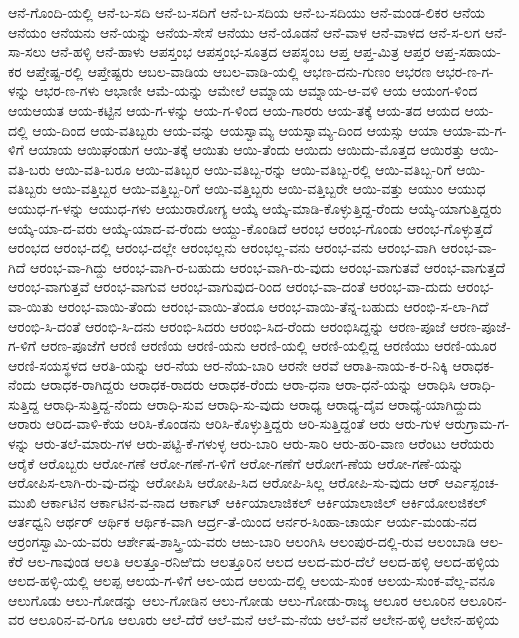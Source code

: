 ಆನೆ-ಗೊಂದಿ-ಯಲ್ಲಿ
ಆನೆ-ಬ-ಸದಿ
ಆನೆ-ಬ-ಸದಿಗೆ
ಆನೆ-ಬ-ಸದಿಯ
ಆನೆ-ಬ-ಸದಿಯು
ಆನೆ-ಮಂಡ-ಲಿಕರ
ಆನೆಯ
ಆನೆಯಂ
ಆನೆಯನು
ಆನೆ-ಯನ್ನು
ಆನೆಯ-ಸೇಸೆ
ಆನೆಯು
ಆನೆ-ಯೊಡನೆ
ಆನೆ-ವಾಳ
ಆನೆ-ವಾಳದ
ಆನೆ-ಸ-ಲಗ
ಆನೆ-ಸಾ-ಸಲು
ಆನೆ-ಹಳ್ಳಿ
ಆನೆ-ಹಾಳು
ಆಪಸ್ತಂಭ
ಆಪಸ್ತಂಭ-ಸೂತ್ರದ
ಆಪಸ್ಥಂಬ
ಆಪ್ತ
ಆಪ್ತ-ಮಿತ್ರ
ಆಪ್ತರ
ಆಪ್ತ-ಸಹಾಯ-ಕರ
ಆಪ್ತೇಷ್ಟ-ರಲ್ಲಿ
ಆಪ್ತೇಷ್ಟರು
ಆಬಲ-ವಾಡಿಯ
ಆಬಲ-ವಾಡಿ-ಯಲ್ಲಿ
ಆಭಣ-ದನು-ಗುಣಂ
ಆಭರಣ
ಆಭರ-ಣ-ಗ-ಳನ್ನು
ಆಭರ-ಣ-ಗಳು
ಆಭಾಣೀ
ಆಮೆ-ಯನ್ನು
ಆಮೇಲೆ
ಆಮ್ನಾಯ
ಆಮ್ನಾಯ-ಆ-ವಳಿ
ಆಯ
ಆಯಂಗ-ಳಿಂದ
ಆಯಆಯತ
ಆಯ-ಕಟ್ಟಿನ
ಆಯ-ಗ-ಳನ್ನು
ಆಯ-ಗ-ಳಿಂದ
ಆಯ-ಗಾರರು
ಆಯ-ತಕ್ಕೆ
ಆಯ-ತದ
ಆಯದ
ಆಯ-ದಲ್ಲಿ
ಆಯ-ದಿಂದ
ಆಯ-ವತಿಬ್ಬರು
ಆಯ-ವನ್ನು
ಆಯಸ್ವಾಮ್ಯ
ಆಯಸ್ವಾಮ್ಯ-ದಿಂದ
ಆಯಸ್ಸು
ಆಯಾ
ಆಯಾ-ಮ-ಗ-ಳಿಗೆ
ಆಯಾಯ
ಆಯಿಘಂಡುಗ
ಆಯಿ-ತಕ್ಕೆ
ಆಯಿತು
ಆಯಿ-ತೆಂದು
ಆಯಿದು
ಆಯಿದು-ಮೊತ್ತದ
ಆಯಿರತ್ತು
ಆಯಿ-ವತಿ-ಬರು
ಆಯಿ-ವತಿ-ಬರೂ
ಆಯಿ-ವತಿಬ್ಬರ
ಆಯಿ-ವತಿಬ್ಬ-ರನ್ನು
ಆಯಿ-ವತಿಬ್ಬ-ರಲ್ಲಿ
ಆಯಿ-ವತಿಬ್ಬ-ರಿಗೆ
ಆಯಿ-ವತಿಬ್ಬರು
ಆಯಿ-ವತ್ತಿಬ್ಬರ
ಆಯಿ-ವತ್ತಿಬ್ಬ-ರಿಗೆ
ಆಯಿ-ವತ್ತಿಬ್ಬರು
ಆಯಿ-ವತ್ತಿಬ್ಬರೇ
ಆಯಿ-ವತ್ತು
ಆಯುಂ
ಆಯುಧ
ಆಯುಧ-ಗ-ಳನ್ನು
ಆಯುಧ-ಗಳು
ಆಯುರಾರೋಗ್ಯ
ಆಯ್ಕೆ
ಆಯ್ಕೆ-ಮಾಡಿ-ಕೊಳ್ಳುತ್ತಿದ್ದ-ರೆಂದು
ಆಯ್ಕೆ-ಯಾಗುತ್ತಿದ್ದರು
ಆಯ್ಕೆ-ಯಾ-ದ-ವರು
ಆಯ್ಕೆ-ಯಾದ-ವ-ರೆಂದು
ಆಯ್ದು-ಕೊಂಡಿದೆ
ಆರಂಭ
ಆರಂಭ-ಗೊಂಡು
ಆರಂಭ-ಗೊಳ್ಳುತ್ತದೆ
ಆರಂಭದ
ಆರಂಭ-ದಲ್ಲಿ
ಆರಂಭ-ದಲ್ಲೇ
ಆರಂಭಲ್ಲನು
ಆರಂಭಲ್ಲ-ವನು
ಆರಂಭ-ವನು
ಆರಂಭ-ವಾಗಿ
ಆರಂಭ-ವಾ-ಗಿದೆ
ಆರಂಭ-ವಾ-ಗಿದ್ದು
ಆರಂಭ-ವಾಗಿ-ರ-ಬಹುದು
ಆರಂಭ-ವಾಗಿ-ರು-ವುದು
ಆರಂಭ-ವಾಗುತವೆ
ಆರಂಭ-ವಾಗುತ್ತದೆ
ಆರಂಭ-ವಾಗುತ್ತವೆ
ಆರಂಭ-ವಾಗುವ
ಆರಂಭ-ವಾಗುವುದ-ರಿಂದ
ಆರಂಭ-ವಾ-ದಂತೆ
ಆರಂಭ-ವಾ-ದುದು
ಆರಂಭ-ವಾ-ಯಿತು
ಆರಂಭ-ವಾಯಿ-ತೆಂದು
ಆರಂಭ-ವಾಯಿ-ತೆಂದೂ
ಆರಂಭ-ವಾಯಿ-ತೆನ್ನ-ಬಹುದು
ಆರಂಭಿ-ಸ-ಲಾ-ಗಿದೆ
ಆರಂಭಿ-ಸಿ-ದಂತೆ
ಆರಂಭಿ-ಸಿ-ದನು
ಆರಂಭಿ-ಸಿದರು
ಆರಂಭಿ-ಸಿದ-ರೆಂದು
ಆರಂಭಿಸಿದ್ದನ್ನು
ಆರಣ-ಪೂಜೆ
ಆರಣ-ಪೂಜೆ-ಗ-ಳಿಗೆ
ಆರಣ-ಪೂಜೆಗೆ
ಆರಣಿ
ಆರಣಿಯ
ಆರಣಿ-ಯನು
ಆರಣಿ-ಯಲ್ಲಿ
ಆರಣಿ-ಯಲ್ಲಿದ್ದ
ಆರಣಿಯು
ಆರಣಿ-ಯೂರ
ಆರಣಿ-ಸಯಸ್ಥಳದ
ಆರತಿ-ಯನ್ನು
ಆರ-ನೆಯ
ಆರ-ನೆಯ-ಬಾರಿ
ಆರನೇ
ಆರವೆ
ಆರಾತಿ-ನಾಯ-ಕ-ರ-ನಿಕ್ಕಿ
ಆರಾಧಕ-ನೆಂದು
ಆರಾಧಕ-ರಾಗಿದ್ದರು
ಆರಾಧಕ-ರಾದರು
ಆರಾಧಕ-ರೆಂದು
ಆರಾ-ಧನಾ
ಆರಾ-ಧನೆ-ಯನ್ನು
ಆರಾಧಿಸಿ
ಆರಾಧಿ-ಸುತ್ತಿದ್ದ
ಆರಾಧಿ-ಸುತ್ತಿದ್ದ-ನೆಂದು
ಆರಾಧಿ-ಸುವ
ಆರಾಧಿ-ಸು-ವುದು
ಆರಾಧ್ಯ
ಆರಾಧ್ಯ-ದೈವ
ಆರಾಧ್ಯೆ-ಯಾಗಿದ್ದುದು
ಆರಾರು
ಆರಿದ-ವಾಳಿ-ಕೆಯ
ಆರಿಸಿ-ಕೊಂಡನು
ಆರಿಸಿ-ಕೊಳ್ಳುತ್ತಿದ್ದರು
ಆರಿ-ಸುತ್ತಿದ್ದಂತೆ
ಆರು
ಆರು-ಗುಳ
ಆರುಗ್ರಾಮ-ಗ-ಳನ್ನು
ಆರು-ತಲೆ-ಮಾರು-ಗಳ
ಆರು-ಪಟ್ಟಿ-ಕೆ-ಗಳುಳ್ಳ
ಆರು-ಬಾರಿ
ಆರು-ಸಾರಿ
ಆರು-ಹರಿ-ವಾಣ
ಆರೆಂಟು
ಆರೆಯರು
ಆರೈಕೆ
ಆರೊಬ್ಬರು
ಆರೋ-ಗಣೆ
ಆರೋ-ಗಣೆ-ಗ-ಳಿಗೆ
ಆರೋ-ಗಣೆಗೆ
ಆರೋಗ-ಣೆಯ
ಆರೋ-ಗಣೆ-ಯನ್ನು
ಆರೋಪಿಸ-ಲಾಗಿ-ರು-ವು-ದನ್ನು
ಆರೋಪಿಸಿ
ಆರೋಪಿ-ಸಿದ
ಆರೋಪಿ-ಸಿಲ್ಲ
ಆರೋಪಿ-ಸು-ವುದು
ಆರ್
ಆರ್ಎಸ್ಪಂಚ-ಮುಖಿ
ಆರ್ಕಾಟಿನ
ಆರ್ಕಾಟಿನ-ವ-ನಾದ
ಆರ್ಕಾಟ್
ಆರ್ಕಿಯಾಲಾಜಿಕಲ್
ಆರ್ಕಿಯಾಲಾಜಿಲ್
ಆರ್ಕಿಯೋಲಜಿಕಲ್
ಆರ್ತಧ್ವನಿ
ಆರ್ಥರ್
ಆರ್ಥಿಕ
ಆರ್ಥಿಕ-ವಾಗಿ
ಆರ್ದ್ರ-ತೆ-ಯಿಂದ
ಆರ್ನರ-ಸಿಂಹಾ-ಚಾರ್ಯ
ಆರ್ಯ-ಮಂಡು-ನದ
ಆರ್ರಂಗಸ್ವಾಮಿ-ಯ-ವರು
ಆರ್ಶೇಷ-ಶಾಸ್ತ್ರಿ-ಯ-ವರು
ಆಱು-ಬಾರಿ
ಆಲಂಗಿಸಿ
ಆಲಂಪುರ-ದಲ್ಲಿ-ರುವ
ಆಲಂಬಾಡಿ
ಆಲ-ಕೆರೆ
ಆಲ-ಗಾವುಂಡ
ಆಲತಿ
ಆಲತ್ತೂ-ರನಿಱಿದು
ಆಲತ್ತೂರಿನ
ಆಲದ
ಆಲದ-ಮರ-ದೆಲೆ
ಆಲದ-ಹಳ್ಳಿ
ಆಲದ-ಹಳ್ಳಿಯ
ಆಲದ-ಹಳ್ಳಿ-ಯಲ್ಲಿ
ಆಲಪ್ಪ
ಆಲಯ-ಗ-ಳಿಗೆ
ಆಲ-ಯದ
ಆಲಯ-ದಲ್ಲಿ
ಆಲಯ-ಸುಂಕ
ಆಲಯ-ಸುಂಕ-ವೆಲ್ಲ-ವನೂ
ಆಲುಗೊಡು
ಆಲು-ಗೋಡನ್ನು
ಆಲು-ಗೋಡಿನ
ಆಲು-ಗೋಡು
ಆಲು-ಗೋಡು-ರಾಜ್ಯ
ಆಲೂರ
ಆಲೂರಿನ
ಆಲೂರಿನ-ವರ
ಆಲೂರಿನ-ವ-ರಿಗೂ
ಆಲೂರು
ಆಲೆ-ದೆರೆ
ಆಲೆ-ಮನೆ
ಆಲೆ-ಮ-ನೆಯ
ಆಲೆ-ವನೆ
ಆಲೇನ-ಹಳ್ಳಿ
ಆಲೇನ-ಹಳ್ಳಿಯ
